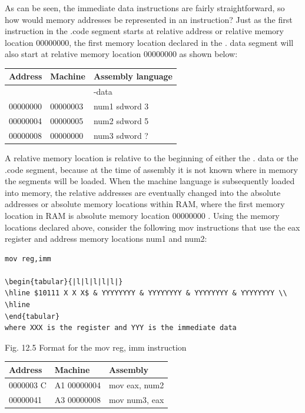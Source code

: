 \documentclass[10pt]{book}
\begin{document}
As can be seen, the immediate data instructions are fairly straightforward, so how would memory addresses be represented in an instruction? Just as the first instruction in the .code segment starts at relative address or relative memory location 00000000, the first memory location declared in the . data segment will also start at relative memory location 00000000 as shown below:

\begin{center}
\begin{tabular}{|l|l|l|}
\hline
Address & Machine & Assembly language \\
\hline
 &  & -data \\
\hline
00000000 & 00000003 & num1 sdword 3 \\
\hline
00000004 & 00000005 & num2 sdword 5 \\
\hline
00000008 & 00000000 & num3 sdword ? \\
\hline
\end{tabular}
\end{center}

A relative memory location is relative to the beginning of either the . data or the .code segment, because at the time of assembly it is not known where in memory the segments will be loaded. When the machine language is subsequently loaded into memory, the relative addresses are eventually changed into the absolute addresses or absolute memory locations within RAM, where the first memory location in RAM is absolute memory location 00000000 . Using the memory locations declared above, consider the following mov instructions that use the eax register and address memory locations num1 and num2:

\begin{verbatim}
mov reg,imm

\begin{tabular}{|l|l|l|l|l|}
\hline $10111 X X X$ & YYYYYYYY & YYYYYYYY & YYYYYYYY & YYYYYYYY \\
\hline
\end{tabular}
where XXX is the register and YYY is the immediate data
\end{verbatim}

Fig. 12.5 Format for the mov reg, imm instruction

\begin{center}
\begin{tabular}{|l|l|l|}
\hline
Address & Machine & Assembly \\
\hline
0000003 C & A1 00000004 & mov eax, num2 \\

\hline
00000041 & A3 00000008 & mov num3, eax \\
\hline
\end{tabular}
\end{center}
\end{document}

